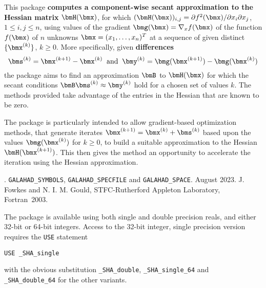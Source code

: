 \documentclass{galahad}
\newcommand{\packagename}{SHA}
\newcommand{\fullpackagename}{\libraryname\_\packagename}
\begin{document}
\galheader


\galsummary
This package
{\bf computes a component-wise secant approximation to the Hessian matrix}
$\bmH(\bmx)$, for which
$(\bmH(\bmx))_{i,j} = \partial f^2 (\bmx) / \partial x_i \partial x_j$,
$1 \leq i, j \leq n$,
using values of the gradient $\bmg(\bmx) = \nabla_x f(\bmx)$
of the function $f(\bmx)$ of $n$ unknowns $\bmx = (x_1, \ldots, x_n)^T$
at a sequence of given distinct $\{\bmx^{(k)}\}$, $k \geq 0$.
More specifically, given {\bf differences}
\[ \bms^{(k)} = \bmx^{(k+1)} - \bmx^{(k)} \;\;\mbox{and}\;\;
   \bmy^{(k)} = \bmg(\bmx^{(k+1)}) - \bmg(\bmx^{(k)})
\]
the package aims to find an approximation $\bmB$ to $\bmH(\bmx)$ for
which the secant conditions $\bmB \bms^{(k)} \approx \bmy^{(k)}$ hold for
a chosen set of values $k$.
The methods provided take advantage of the entries in the Hessian that
are known to be zero.

The package is particularly intended to allow gradient-based
optimization methods, that generate iterates
$\bmx^{(k+1)} = \bmx^{(k)} + \bms^{(k)}$ based upon the values $\bmg( \bmx^{(k)})$
for $k \geq 0$, to build a suitable approximation to the Hessian
$\bmH(\bmx^{(k+1)})$. This then gives the method an opportunity to
accelerate the iteration using the Hessian approximation.


\galattributes
\galversions{\tt  \fullpackagename\_single, \fullpackagename\_double}.
\galuses
{\tt GALAHAD\_SY\-M\-BOLS},
{\tt GALAHAD\_SP\-ECFILE} and
{\tt GALAHAD\_SPACE}.
\galdate August 2023.
\galorigin J. Fowkes and N. I. M. Gould, STFC-Rutherford Appleton Laboratory,
\gallanguage Fortran~2003.


\galhowto

The package is available using both single and double precision reals,
and either 32-bit or 64-bit integers. Access to the 32-bit integer,
single precision version requires the {\tt USE} statement
\medskip

\hspace{8mm} {\tt USE \fullpackagename\_single}

\medskip
\noindent
with the obvious substitution {\tt \fullpackagename\_double},
{\tt \fullpackagename\_single\_64} and
{\tt \fullpackagename\_double\_64} for the other variants.
\end{document}
